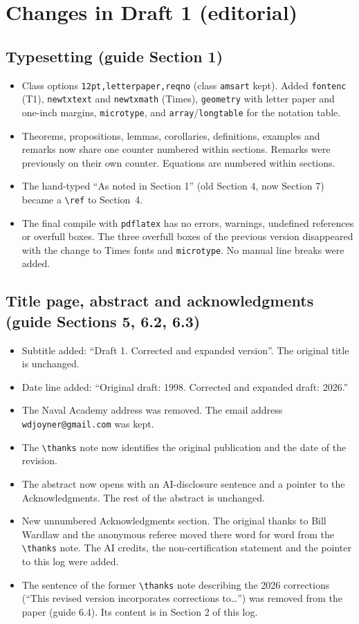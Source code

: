 \documentclass[12pt,letterpaper]{amsart}
\begin{document}
\section{Changes in Draft 1 (editorial)}

\subsection{Typesetting (guide Section 1)}
\begin{itemize}
\item Class options \texttt{12pt,letterpaper,reqno} (class \texttt{amsart}
kept). Added \texttt{fontenc} (T1), \texttt{newtxtext} and
\texttt{newtxmath} (Times), \texttt{geometry} with letter paper and one-inch
margins, \texttt{microtype}, and \texttt{array}/\texttt{longtable} for the
notation table.
\item Theorems, propositions, lemmas, corollaries, definitions, examples and
remarks now share one counter numbered within sections. Remarks were
previously on their own counter. Equations are numbered within sections.
\item The hand-typed ``As noted in Section 1'' (old Section 4, now Section 7)
became a \verb|\ref| to Section~4.
\item The final compile with \texttt{pdflatex} has no errors, warnings,
undefined references or overfull boxes. The three overfull boxes of the
previous version disappeared with the change to Times fonts and
\texttt{microtype}. No manual line breaks were added.
\end{itemize}

\subsection{Title page, abstract and acknowledgments (guide Sections 5, 6.2,
6.3)}
\begin{itemize}
\item Subtitle added: ``Draft 1. Corrected and expanded version''. The original
title is unchanged.
\item Date line added: ``Original draft: 1998. Corrected and expanded draft:
2026.''
\item The Naval Academy address was removed. The email address
\texttt{wdjoyner@gmail.com} was kept.
\item The \verb|\thanks| note now identifies the original publication and
the date of the revision.
\item The abstract now opens with an AI-disclosure sentence and a pointer to
the Acknowledgments. The rest of the abstract is unchanged.
\item New unnumbered Acknowledgments section. The original thanks to Bill
Wardlaw and the anonymous referee moved there word for word from the
\verb|\thanks| note. The AI credits, the non-certification statement and the
pointer to this log were added.
\item The sentence of the former \verb|\thanks| note describing the 2026
corrections (``This revised version incorporates corrections to\ldots'') was
removed from the paper (guide 6.4). Its content is in Section 2 of this log.
\end{itemize}
\end{document}
